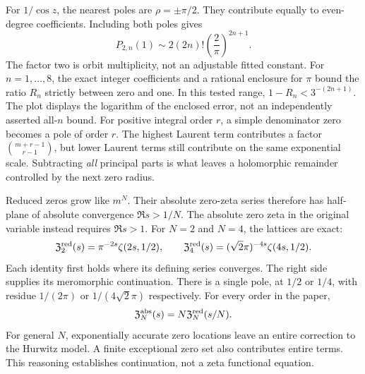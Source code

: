 For $1/\cos z$, the nearest poles are $\rho=\pm\pi/2$. They contribute equally to even-degree coefficients. Including both poles gives
\[
P_{2,n}(1)\sim2(2n)!\left(\frac2\pi\right)^{2n+1}.
\]
The factor two is orbit multiplicity, not an adjustable fitted constant.
For $n=1,\ldots,8$, the exact integer coefficients and a rational enclosure for $\pi$ bound the ratio $R_n$ strictly between zero and one. In this tested range, $1-R_n<3^{-(2n+1)}$. The plot displays the logarithm of the enclosed error, not an independently asserted all-$n$ bound.
For positive integral order $r$, a simple denominator zero becomes a pole of order $r$. The highest Laurent term contributes a factor $\binom{m+r-1}{r-1}$, but lower Laurent terms still contribute on the same exponential scale. Subtracting \emph{all} principal parts is what leaves a holomorphic remainder controlled by the next zero radius.

Reduced zeros grow like $m^N$. Their absolute zero-zeta series therefore has half-plane of absolute convergence $\Re s>1/N$. The absolute zero zeta in the original variable instead requires $\Re s>1$.
For $N=2$ and $N=4$, the lattices are exact:
\[
\mathfrak Z_2^{\rm red}(s)=\pi^{-2s}\zeta(2s,1/2),\qquad
\mathfrak Z_4^{\rm red}(s)=(\sqrt2\pi)^{-4s}\zeta(4s,1/2).
\]
Each identity first holds where its defining series converges. The right side supplies its meromorphic continuation. There is a single pole, at $1/2$ or $1/4$, with residue $1/(2\pi)$ or $1/(4\sqrt2\pi)$ respectively.
For every order in the paper,
\[
\mathfrak Z_N^{\rm abs}(s)=N\mathfrak Z_N^{\rm red}(s/N).
\]
For general $N$, exponentially accurate zero locations leave an entire correction to the Hurwitz model. A finite exceptional zero set also contributes entire terms. This reasoning establishes continuation, not a zeta functional equation.

